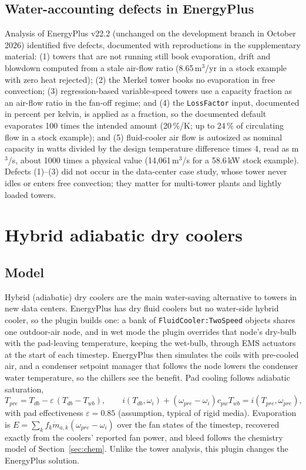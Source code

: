 \documentclass[preprint,12pt,authoryear]{elsarticle}
\begin{document}
\subsection{Water-accounting defects in EnergyPlus}
Analysis of EnergyPlus v22.2 (unchanged on the development branch in October 2026) identified five defects, documented
with reproductions in the supplementary material: (1) towers that are not running still book evaporation, drift and
blowdown computed from a stale air-flow ratio (8.65\,m$^3$/yr in a stock example with zero heat rejected);
(2) the Merkel tower books no evaporation in free convection; (3) regression-based variable-speed towers use a capacity
fraction as an air-flow ratio in the fan-off regime; and (4) the \texttt{LossFactor} input, documented in percent per
kelvin, is applied as a fraction, so the documented default evaporates 100 times the intended amount (20\,\%/K;
up to 24\,\% of circulating flow in a stock example); and (5) fluid-cooler air flow is autosized as nominal capacity in
watts divided by the design temperature difference times 4, read as m$^3$/s, about 1000 times a physical value
(14,061\,m$^3$/s for a 58.6\,kW stock example). Defects (1)--(3) did not occur in the data-center case study,
whose tower never idles or enters free convection; they matter for multi-tower plants and lightly loaded towers.


\section{Hybrid adiabatic dry coolers}\label{sec:hybrid}
\subsection{Model}
Hybrid (adiabatic) dry coolers are the main water-saving alternative to towers in new data centers. EnergyPlus has
dry fluid coolers but no water-side hybrid cooler, so the plugin builds one: a bank of \texttt{FluidCooler:TwoSpeed}
objects shares one outdoor-air node, and in wet mode the plugin overrides that node's dry-bulb with the pad-leaving
temperature, keeping the wet-bulb, through EMS actuators at the start of each timestep. EnergyPlus then simulates the
coils with pre-cooled air, and a condenser setpoint manager that follows the node lowers the condenser water
temperature, so the chillers see the benefit. Pad cooling follows adiabatic saturation,
\begin{equation}
T_{pre} = T_{db} - \varepsilon\,(T_{db}-T_{wb}),\qquad i(T_{db},\omega_i) + (\omega_{pre}-\omega_i)c_{pw}T_{wb} = i(T_{pre},\omega_{pre}),
\end{equation}
with pad effectiveness $\varepsilon=0.85$ (assumption, typical of rigid media). Evaporation is
$E=\sum_k f_k\dot m_{a,k}(\omega_{pre}-\omega_i)$ over the fan states of the timestep, recovered exactly from the
coolers' reported fan power, and bleed follows the chemistry model of Section~\ref{sec:chem}. Unlike the tower
analysis, this plugin changes the EnergyPlus solution.
\end{document}
